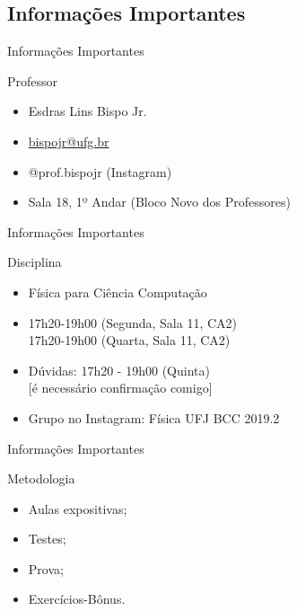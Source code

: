 \documentclass[xcolor=dvipsnames,table]{beamer}
\begin{document}
	\subsection{Informações Importantes}
	\begin{frame}{Informações Importantes}
		\begin{block}{Professor}
			\begin{itemize}
				\item Esdras Lins Bispo Jr.
				\item \url{bispojr@ufg.br}
				\item @prof.bispojr (Instagram)
				\item Sala 18, 1º Andar (Bloco Novo dos Professores)
			\end{itemize}
		\end{block}
	\end{frame}	 
	
	\begin{frame}{Informações Importantes}
		\begin{block}{Disciplina}
			\begin{itemize}
				\item Física para Ciência Computação
				\item 17h20-19h00 (Segunda, Sala 11, CA2)\\
					  17h20-19h00 (Quarta, Sala 11, CA2)
				\item Dúvidas: 17h20 - 19h00 (Quinta)\\
					  {\color{red}[é necessário confirmação comigo]}
				\item Grupo no Instagram: Física UFJ BCC 2019.2
			\end{itemize}
		\end{block}
	\end{frame}
	
	\begin{frame}{Informações Importantes}
		\begin{block}{Metodologia}
			\begin{itemize}
				\item Aulas expositivas;
				\item Testes;
				\item Prova;
				\item Exercícios-Bônus.
			\end{itemize}
		\end{block}
	\end{frame}
	
\end{document}
